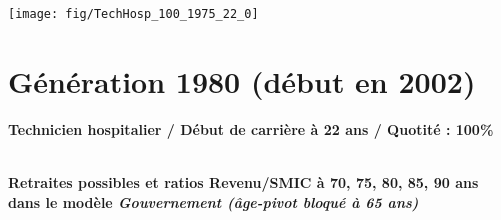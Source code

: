  \vspace{0.1cm} 

 {\hspace{-2.2cm}\texttt{[image: fig/TechHosp\_100\_1975\_22\_0]}} 

\newpage 
 
\section{Génération 1980 (début en 2002)\label{TechHosp_100_1980_22_0}} 
 
{\bf \noindent Technicien hospitalier / Début de carrière à 22 ans / Quotité : 100\%}  ~ 

 ~\\{\bf \noindent Retraites possibles et ratios Revenu/SMIC à 70, 75, 80, 85, 90 ans dans le modèle \emph{Gouvernement (âge-pivot bloqué à 65 ans)}}  
 
